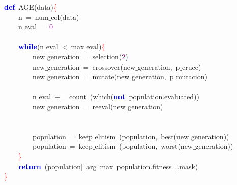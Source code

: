\noindent
\mbox{}\textbf{\textcolor{Blue}{def}}\ AGE\textcolor{BrickRed}{(}data\textcolor{BrickRed}{)}\textcolor{Red}{\{} \\
\mbox{}\ \ \ \ n\ \textcolor{BrickRed}{=}\ num$\_$col\textcolor{BrickRed}{(}data\textcolor{BrickRed}{)} \\
\mbox{}\ \ \ \ n$\_$eval\ \textcolor{BrickRed}{=}\ \textcolor{Purple}{0} \\
\mbox{} \\
\mbox{}\ \ \ \ \textbf{\textcolor{Blue}{while}}\textcolor{BrickRed}{(}n$\_$eval\ \textcolor{BrickRed}{\textless{}}\ max$\_$eval\textcolor{BrickRed}{)}\textcolor{Red}{\{} \\
\mbox{}\ \ \ \ \ \ \ \ new$\_$generation\ \textcolor{BrickRed}{=}\ selection\textcolor{BrickRed}{(}\textcolor{Purple}{2}\textcolor{BrickRed}{)} \\
\mbox{}\ \ \ \ \ \ \ \ new$\_$generation\ \textcolor{BrickRed}{=}\ crossover\textcolor{BrickRed}{(}new$\_$generation\textcolor{BrickRed}{,}\ p$\_$cruce\textcolor{BrickRed}{)} \\
\mbox{}\ \ \ \ \ \ \ \ new$\_$generation\ \textcolor{BrickRed}{=}\ mutate\textcolor{BrickRed}{(}new$\_$generation\textcolor{BrickRed}{,}\ p$\_$mutacion\textcolor{BrickRed}{)} \\
\mbox{} \\
\mbox{}\ \ \ \ \ \ \ \ n$\_$eval\ \textcolor{BrickRed}{+=}\ count\ \textcolor{BrickRed}{(}which\textcolor{BrickRed}{(}\textbf{\textcolor{Blue}{not}}\ population\textcolor{BrickRed}{.}evaluated\textcolor{BrickRed}{))} \\
\mbox{}\ \ \ \ \ \ \ \ new$\_$generation\ \textcolor{BrickRed}{=}\ reeval\textcolor{BrickRed}{(}new$\_$generation\textcolor{BrickRed}{)} \\
\mbox{} \\
\mbox{} \\
\mbox{}\ \ \ \ \ \ \ \ population\ \textcolor{BrickRed}{=}\ keep$\_$elitism\ \textcolor{BrickRed}{(}population\textcolor{BrickRed}{,}\ best\textcolor{BrickRed}{(}new$\_$generation\textcolor{BrickRed}{))} \\
\mbox{}\ \ \ \ \ \ \ \ population\ \textcolor{BrickRed}{=}\ keep$\_$elitism\ \textcolor{BrickRed}{(}population\textcolor{BrickRed}{,}\ worst\textcolor{BrickRed}{(}new$\_$generation\textcolor{BrickRed}{))} \\
\mbox{}\ \ \ \ \textcolor{Red}{\}} \\
\mbox{}\ \ \ \ \textbf{\textcolor{Blue}{return}}\ \textcolor{BrickRed}{(}population\textcolor{BrickRed}{[}\ arg\ max\ population\textcolor{BrickRed}{.}fitness\ \textcolor{BrickRed}{].}mask\textcolor{BrickRed}{)} \\
\mbox{}\textcolor{Red}{\}} \\
\mbox{}
